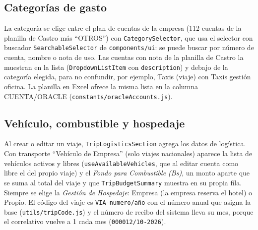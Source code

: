 \documentclass[11pt,letterpaper]{article}
\newcommand{\code}[1]{\nolinkurl{#1}}
\begin{document}
\subsection{Categorías de gasto}
La categoría se elige entre el plan de cuentas de la empresa (112 cuentas de la planilla de Castro más ``OTROS'') con \code{CategorySelector}, que usa el selector con buscador \code{SearchableSelector} de \code{components/ui}: se puede buscar por número de cuenta, nombre o nota de uso. Las cuentas con nota de la planilla de Castro la muestran en la lista (\code{DropdownListItem} con \code{description}) y debajo de la categoría elegida, para no confundir, por ejemplo, Taxis (viaje) con Taxis gestión oficina. La planilla en Excel ofrece la misma lista en la columna CUENTA/ORACLE (\code{constants/oracleAccounts.js}).

\subsection{Vehículo, combustible y hospedaje}
Al crear o editar un viaje, \code{TripLogisticsSection} agrega los datos de logística. Con transporte ``Vehículo de Empresa'' (solo viajes nacionales) aparece la lista de vehículos activos y libres (\code{useAvailableVehicles}, que al editar cuenta como libre el del propio viaje) y el \emph{Fondo para Combustible (Bs)}, un monto aparte que se suma al total del viaje y que \code{TripBudgetSummary} muestra en su propia fila. Siempre se elige la \emph{Gestión de Hospedaje}: Empresa (la empresa reserva el hotel) o Propio. El código del viaje es \code{VIA-numero/año} con el número anual que asigna la base (\code{utils/tripCode.js}) y el número de recibo del sistema lleva su mes, porque el correlativo vuelve a 1 cada mes (\code{000012/10-2026}).
\end{document}
